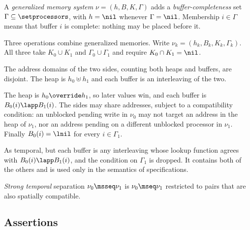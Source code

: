 A \emph{generalized memory system} $\nu = (h,B,K,\Gamma)$ adds a
\emph{buffer-completeness} set $\Gamma \subseteq \setprocessors$, with
$h = \nil$ whenever $\Gamma = \nil$. Membership $i \in \Gamma$ means that
buffer $i$ is complete: nothing may be placed before it.

Three operations combine generalized memories. Write $\nu_k =
(h_k,B_k,K_k,\Gamma_k)$. All three take $K_0 \cup K_1$ and
$\Gamma_0 \cup \Gamma_1$ and require $K_0 \cap K_1 = \nil$.
\begin{description}[nosep,leftmargin=1.5em]
  \item[Spatial, $\nu_0 \msep \nu_1$.] The address domains of the two
    sides, counting both heaps and buffers, are disjoint. The heap is
    $h_0 \uplus h_1$ and each buffer is an interleaving of the two.
  \item[Temporal, $\nu_0 \mseq \nu_1$.] The heap is $h_0 \override h_1$, so
    later values win, and each buffer is $B_0(i) \lapp B_1(i)$. The sides
    may share addresses, subject to a compatibility condition: an unblocked
    pending write in $\nu_0$ may not target an address in the heap of
    $\nu_1$, nor an address pending on a different unblocked processor in
    $\nu_1$. Finally $B_0(i) = \lnil$ for every $i \in \Gamma_1$.
  \item[Spatiotemporal, $\nu_0 \mhash \nu_1$.] As temporal, but each buffer
    is any interleaving whose lookup function agrees with
    $B_0(i) \lapp B_1(i)$, and the condition on $\Gamma_1$ is dropped. It
    contains both of the others and is used only in the semantics of
    specifications.
\end{description}
\emph{Strong temporal} separation $\nu_0 \msseq \nu_1$ is $\nu_0 \mseq
\nu_1$ restricted to pairs that are also spatially compatible.

\subsection{Assertions}

